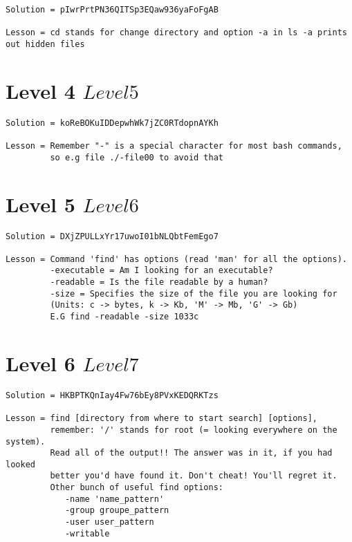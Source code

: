 \documentclass[a4paper]{report}
\begin{document}
\begin{verbatim}
Solution = pIwrPrtPN36QITSp3EQaw936yaFoFgAB

Lesson = cd stands for change directory and option -a in ls -a prints out hidden files
\end{verbatim}


\section{Level 4 \rightarrow $ Level 5 $}

\begin{verbatim}
Solution = koReBOKuIDDepwhWk7jZC0RTdopnAYKh

Lesson = Remember "-" is a special character for most bash commands, 
		 so e.g file ./-file00 to avoid that
\end{verbatim}


\section{Level 5 \rightarrow $ Level 6 $}

\begin{verbatim}
Solution = DXjZPULLxYr17uwoI01bNLQbtFemEgo7

Lesson = Command 'find' has options (read 'man' for all the options). 
		 -executable = Am I looking for an executable? 
		 -readable = Is the file readable by a human? 
		 -size = Specifies the size of the file you are looking for 
		 (Units: c -> bytes, k -> Kb, 'M' -> Mb, 'G' -> Gb)
	 	 E.G find -readable -size 1033c
\end{verbatim}

\newpage
\section{Level 6 \rightarrow $ Level 7 $}

\begin{verbatim}
Solution = HKBPTKQnIay4Fw76bEy8PVxKEDQRKTzs

Lesson = find [directory from where to start search] [options], 
		 remember: '/' stands for root (= looking everywhere on the system). 
		 Read all of the output!! The answer was in it, if you had looked 
		 better you'd have found it. Don't cheat! You'll regret it. 
		 Other bunch of useful find options: 
		 	-name 'name_pattern'
		 	-group groupe_pattern
		 	-user user_pattern 
		 	-writable
\end{verbatim}
\end{document}
